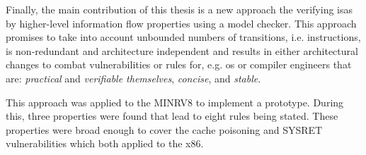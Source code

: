 Finally, the main contribution of this thesis is a new approach the verifying \glspl{isa} by higher-level information flow properties using a model checker.
This approach promises to take into account unbounded numbers of transitions, i.e. instructions, is non-redundant and architecture independent and results in either architectural changes to combat vulnerabilities or rules for, e.g. \gls{os} or compiler engineers that are: \textit{practical} and \textit{verifiable themselves}, \textit{concise}, and \textit{stable}.

This approach was applied to the MINRV8 to implement a prototype.
During this, three properties were found that lead to eight rules being stated.
These properties were broad enough to cover the cache poisoning and SYSRET vulnerabilities which both applied to the x86.
